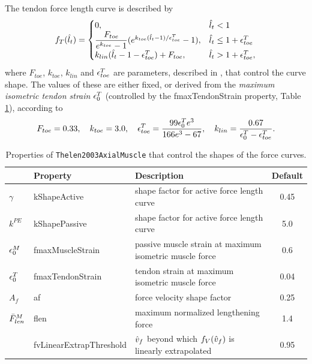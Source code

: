 The tendon force length curve is described by
\begin{equation}
f_T(\hat{l}_t) = 
\begin{cases}
0, & \hat{l}_t < 1 \\
\dfrac{F_{toe}}{e^{k_{toe}}-1}(e^{k_{toe} (\hat{l}_t-1)/\epsilon^T_{toe}}-1), &
\hat{l}_t \le 1+\epsilon^T_{toe}\\
k_{lin} (\hat{l}_t - 1 - \epsilon^T_{toe}) + F_{toe}, &
\hat{l}_t  > 1+\epsilon^T_{toe},
\end{cases}
\label{Thelen2003TFLC:eqn}
\end{equation}
%
where $F_{toe}$, $k_{toe}$, $k_{lin}$ and $\epsilon^T_{toe}$ are
parameters, described in \cite{thelen2003adjustment}, that control the
curve shape. The values of these are either fixed, or derived from the
{\it maximum isometric tendon strain} $\epsilon_0^T$ (controlled by the
{\sf fmaxTendonStrain} property, Table \ref{ThelenProps:tab}),
according to
%
\begin{equation}
F_{toe} = 0.33, \quad k_{toe} = 3.0, \quad
\epsilon^T_{toe} = \frac{99 \epsilon_0^T e^3}{166 e^3 - 67}, \quad
k_{lin} = \frac{0.67}{\epsilon_0^T - \epsilon^T_{toe}}.
\label{Thelen2003TFLCParams:eqn}
\end{equation}
%

\begin{table}[h]
\begin{center}
\begin{tabular}{|l|l|l|c|} 
\hline
& Property & Description & Default\\
\hline
$\gamma$ & {\sf kShapeActive} & 
shape factor for active force length curve & 0.45 \\
$k^{PE}$ & {\sf kShapePassive} & 
shape factor for active force length curve & 5.0 \\
$\epsilon_0^M$ & {\sf fmaxMuscleStrain} & 
passive muscle strain at maximum isometric muscle force & 0.6 \\
$\epsilon_0^T$ & {\sf fmaxTendonStrain} & 
tendon strain at maximum isometric muscle force & 0.04 \\
$A_f$ & {\sf af} & 
force velocity shape factor & 0.25 \\
$\bar{F}^M_{len}$ & {\sf flen} & 
maximum normalized lengthening force & 1.4 \\
& {\sf fvLinearExtrapThreshold} &
$\hat{v}_f$ beyond which $f_V(\hat{v}_f)$ is linearly extrapolated & 0.95\\
\hline
\end{tabular}
\end{center}
\caption{Properties of {\tt Thelen2003AxialMuscle} that control
the shapes of the force curves.}
\label{ThelenProps:tab}
\end{table}

